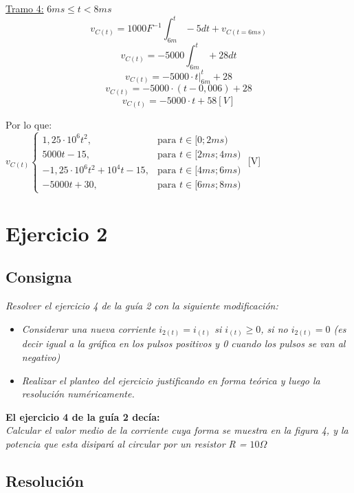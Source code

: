     \newpage

    \underline{Tramo 4:} $6ms \leq t < 8ms$
    \[ v_{C(t)} = 1000F^{-1} \int_{6m}^t  -5   dt + v_{C(t=6ms)} \]
    \[ v_{C(t)} = -5000 \int_{6m}^t   +28  dt  \]
    \[ v_{C(t)} = -5000\cdot t\rvert_{6m}^t+28 \]
    \[ v_{C(t)} = -5000\cdot (t-0,006)+28 \]
    \[ v_{C(t)} = -5000\cdot t +58 [V] \]
    
    Por lo que: \\
    $
    v_{C(t)}
    \begin{cases}
        1,25\cdot 10^6t^2, & \text{para } t \in [0;2ms) \\
        5000t-15, & \text{para } t \in [2ms; 4ms) \\
        -1,25\cdot10^6t^2+10^4t-15, & \text{para } t \in [4ms; 6ms) \\
        -5000t+30, & \text{para } t \in [6ms; 8ms)
    \end{cases}
    $ [V] \\[5pt]

\section{Ejercicio 2}
\subsection{Consigna}
\sangria{} \textit{Resolver el ejercicio 4 de la guía 2 con la siguiente modificación:} \begin{itemize} \item \textit{Considerar una nueva corriente $i_{2(t)} = i_{(t)}$ si $i_{(t)} \geq 0$, si no $i_{2(t)} = 0 $ (es decir igual a la gráfica en los pulsos positivos y 0 cuando los pulsos se van al negativo)} \item \textit{Realizar el planteo del ejercicio justificando en forma teórica y luego la resolución numéricamente.} \end{itemize}

\textbf{El ejercicio 4 de la guía 2 decía:}\\
\textit{Calcular el valor medio de la corriente cuya forma se muestra en la figura 4, y la potencia que esta disipará al circular por un resistor R = $10\Omega$}

\newpage
\subsection{Resolución}

